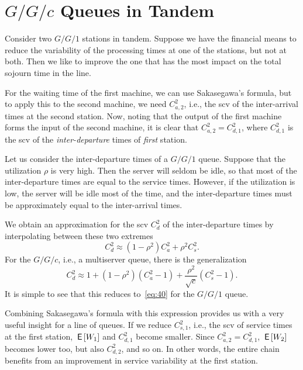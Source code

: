 \documentclass[stochastic-or.tex]{subfiles}
\begin{document}
\section{\texorpdfstring{$G/G/c$}{GGc} Queues in Tandem}
\label{sec:tandem-queues}


Consider two $G/G/1$ stations in tandem.
Suppose we have the financial means to reduce the variability of the processing times at  one of the stations, but not at both.
Then we like to improve the one that has the most impact on the total sojourn time in the line.

For the waiting time of the first machine, we can use Sakasegawa's formula, but to apply this to the second machine, we need $C^2_{a,2}$, i.e., the scv of the inter-arrival times at the second station.
Now, noting that the output of the first machine forms the input of the second machine, it is clear that $C^2_{a,2}=C^2_{d,1}$, where $C^2_{d,1}$ is the scv of the \emph{inter-departure} times of \emph{first} station.


Let us consider the inter-departure times of a $G/G/1$ queue.
Suppose that the  utilization $\rho$ is very high.
Then the server will seldom be idle, so that most of the inter-departure times are equal to the service times.
However, if the utilization is low, the server will be idle most of the time, and the inter-departure times must be approximately equal to the inter-arrival times.

We obtain an  approximation for the scv $C_{d}^2$ of the inter-departure times by  interpolating between these two extremes
\begin{equation} \label{eq:40}
 C_{d}^2 \approx  (1-\rho^2) C_{a}^2 + \rho^2 C_{s}^2.
\end{equation}
For the $G/G/c$, i.e., a multiserver queue, there is the generalization
\begin{equation*}
 C_{d}^2 \approx 1 + (1-\rho^2)(C_{a}^2-1) + \frac{\rho^2}{\sqrt{c}}(C_{s}^2-1).
\end{equation*}
It is simple to see that this reduces to~\cref{eq:40} for the $G/G/1$ queue.

Combining Sakasegawa's formula with this expression provides us with a very useful insight for a line of queues.
If we reduce $C^2_{s,1}$, i.e., the scv of service times at the first station, $\,\mathsf{E}\left[W_1\right]$ and $C^2_{d,1}$ become smaller.
Since $C^2_{a,2}=C^2_{d,1}$, $\,\mathsf{E}\left[W_2\right]$ becomes lower too, but also $C^2_{d,2}$, and so on.
In other words, the entire chain benefits from an improvement in service variability at the first station.
\end{document}
